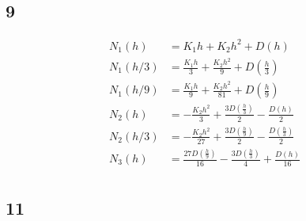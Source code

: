 \documentclass{oisinclass}
\begin{document}
\subsection*{9}
\begin{align*}
	N_1(h)   & = K_{1} h + K_{2} h^{2} + D{\left(h \right)}                                                                            \\
	N_1(h/3) & = \frac{K_{1} h}{3} + \frac{K_{2} h^{2}}{9} + D{\left(\frac{h}{3} \right)}                                              \\
	N_1(h/9) & = \frac{K_{1} h}{9} + \frac{K_{2} h^{2}}{81} + D{\left(\frac{h}{9} \right)}                                             \\
	N_2(h)   & = - \frac{K_{2} h^{2}}{3} + \frac{3 D{\left(\frac{h}{3} \right)}}{2} - \frac{D{\left(h \right)}}{2}                     \\
	N_2(h/3) & = - \frac{K_{2} h^{2}}{27} + \frac{3 D{\left(\frac{h}{9} \right)}}{2} - \frac{D{\left(\frac{h}{3} \right)}}{2}          \\
	N_3(h)   & = \frac{27 D{\left(\frac{h}{9} \right)}}{16} - \frac{3 D{\left(\frac{h}{3} \right)}}{4} + \frac{D{\left(h \right)}}{16} \\
\end{align*}

\subsection*{11}
\end{document}
